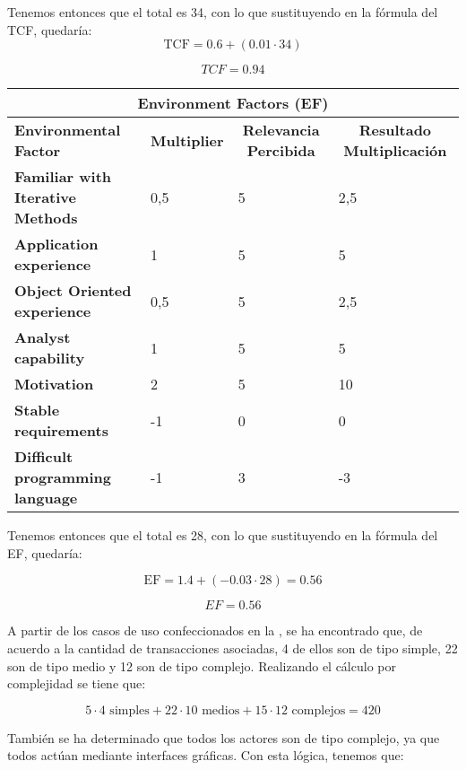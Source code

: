 Tenemos entonces que el total es 34, con lo que sustituyendo en la fórmula del TCF, quedaría:
\[
\text{TCF} = 0.6+(0.01\cdot34)
\]

\[
TCF = 0.94
\]

\begin{center}
  \begin{tabular}{ | p{4cm} | p{2cm} | p{4cm}| p{5cm} | } 
    \hline
    \multicolumn{4}{|c|}{\textbf{Environment Factors (EF)}} \\
    \hline
    \multicolumn{1}{|p{3cm}|}{\textbf{Environmental Factor}} & \multicolumn{1}{|c|}{\textbf{Multiplier}} & \multicolumn{1}{|c|}{\textbf{Relevancia Percibida}} & \multicolumn{1}{|c|}{\textbf{Resultado Multiplicación}} \\
    \hline
    
    {\textbf{Familiar with Iterative Methods}} & 0,5 & 5 & 2,5 \\ \hline
    {\textbf{Application experience}} & 1 & 5 & 5 \\ \hline
    {\textbf{Object Oriented experience}} & 0,5 & 5 & 2,5 \\ \hline
    {\textbf{Analyst capability}} & 1 & 5 & 5 \\ \hline
    {\textbf{Motivation}} & 2 & 5 & 10 \\ \hline
    {\textbf{Stable requirements}} & -1 & 0 & 0 \\ \hline
    {\textbf{Difficult programming language}} & -1 & 3 & -3 \\ \hline
  \end{tabular}
  
    \label{table:ef}
\end{center}

Tenemos entonces que el total es 28, con lo que sustituyendo en la fórmula del EF, quedaría:

\[
\text{EF}=1.4+(-0.03\cdot28) = 0.56
\]

\[
EF = 0.56
\]

A partir de los casos de uso confeccionados en la , se ha encontrado que, de acuerdo a la cantidad de transacciones asociadas,  4 de ellos son de tipo simple, 22 son 
de tipo medio y 12 son de tipo complejo. Realizando el cálculo por complejidad se tiene que:

\[
5 \cdot 4 \text{ simples} + 22 \cdot 10 \text{ medios} + 15 \cdot 12 \text{ complejos} = 420
\]

También se ha determinado que todos los actores son de tipo complejo, ya que todos actúan mediante interfaces gráficas. Con esta lógica, tenemos que:

